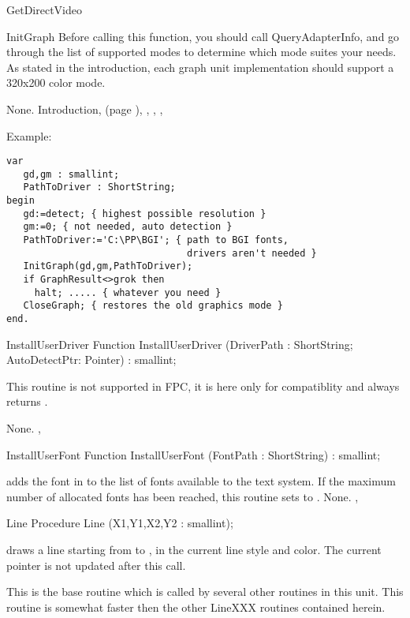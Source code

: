\begin{function}{GetDirectVideo}
\begin{procedure}{InitGraph}
Before calling this function, you should call QueryAdapterInfo, and
go through the list of supported modes to determine which mode suites
your needs. As stated in the introduction, each graph unit implementation
should support a 320x200 color mode.

\Errors
None.
\SeeAlso
Introduction, (page \pageref{se:Introduction}),
, , ,
\end{procedure}
Example:
\begin{verbatim}
var
   gd,gm : smallint;
   PathToDriver : ShortString;
begin
   gd:=detect; { highest possible resolution }
   gm:=0; { not needed, auto detection }
   PathToDriver:='C:\PP\BGI'; { path to BGI fonts,
                                drivers aren't needed }
   InitGraph(gd,gm,PathToDriver);
   if GraphResult<>grok then
     halt; ..... { whatever you need }
   CloseGraph; { restores the old graphics mode }
end.
\end{verbatim}

\begin{function}{InstallUserDriver}
\Declaration
Function InstallUserDriver (DriverPath : ShortString; AutoDetectPtr: Pointer) : smallint;

\Description
This routine is not supported in FPC, it is here only for compatiblity and
always returns .

\Errors
None.
\SeeAlso
{}, 
\end{function}
\begin{function}{InstallUserFont}
\Declaration
Function InstallUserFont (FontPath : ShortString) : smallint;

\Description
{} adds the font in  to the list of fonts
available to the text system. If the maximum number of allocated fonts has
been reached, this routine sets  to .
\Errors
None.
\SeeAlso
{}, 
\end{function}
\begin{procedure}{Line}
\Declaration
Procedure Line (X1,Y1,X2,Y2 : smallint);

\Description
{} draws a line starting from
 to , in the current line style and color.
The current pointer is not updated after this call.

This is the base routine which is called by several other routines
in this unit. This routine is somewhat faster then the other
LineXXX routines contained herein.



\end{procedure}
\end{function}
